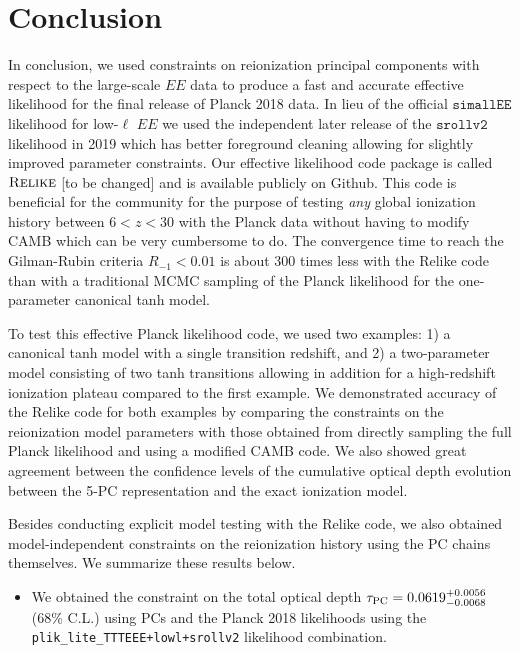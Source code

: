\documentclass[prd,twocolumn,amsmath,amssymb,floatfix,superscriptaddress,nofootinbib]{revtex4-1}
\begin{document}
{\section{Conclusion}
\label{sec:conclusion}

In conclusion, we used constraints on reionization principal components with respect to the large-scale $EE$ data to produce a fast and accurate effective likelihood for the final release of Planck 2018 data. In lieu of the official $\texttt{simallEE}$ likelihood for low-$\ell$ $EE$ we used the independent later release of the $\texttt{srollv2}$ likelihood in 2019 which has better foreground cleaning allowing for slightly improved parameter constraints. Our effective likelihood code package is called $\textsc{Relike}$ [to be changed] and is available publicly on Github. This code is beneficial for the community for the purpose of testing \textit{any} global ionization history between $6 < z < 30$ with the Planck data without having to modify CAMB which can be very cumbersome to do. The convergence time to reach the Gilman-Rubin criteria $R_{-1} < 0.01$ is about 300 times less with the Relike code than with a traditional MCMC sampling of the Planck likelihood for the one-parameter canonical tanh model. 

To test this effective Planck likelihood code, we used two examples: 1) a canonical tanh model with a single transition redshift, and 2) a two-parameter model consisting of two tanh transitions allowing in addition for a high-redshift ionization plateau compared to the first example. We demonstrated accuracy of the Relike code for both examples by comparing the constraints on the reionization model parameters with those obtained from directly sampling the full Planck likelihood and using a modified CAMB code. We also showed great agreement between the confidence levels of the cumulative optical depth evolution between the 5-PC representation and the exact ionization model.

Besides conducting explicit model testing with the Relike code, we also obtained model-independent constraints on the reionization history using the PC chains themselves. We summarize these results below.

\begin{itemize}

    \item {We obtained the constraint on the total optical depth $\tau_{\rm PC} = 0.0619^{+0.0056}_{-0.0068}$ (68\% C.L.) 
    using PCs and the Planck 2018 likelihoods using the \texttt{plik\_lite\_TTTEEE+lowl+srollv2} likelihood combination.}
    

\end{itemize}}
\end{document}
